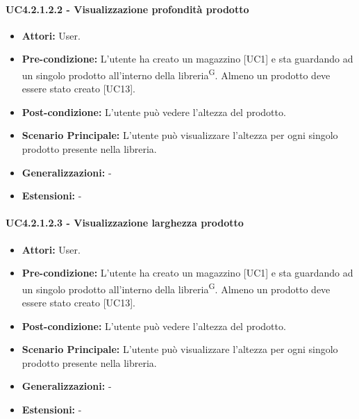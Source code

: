 \paragraph{UC4.2.1.2.2 - Visualizzazione profondità prodotto}
\begin{itemize} 
    \item \textbf{Attori:} User.
    \item \textbf{Pre-condizione:} L'utente ha creato un magazzino [UC1] e sta guardando ad un singolo prodotto all'interno della libreria\textsuperscript{G}. Almeno un prodotto deve essere stato creato [UC13].
    \item \textbf{Post-condizione:}  L'utente può vedere l'altezza del prodotto.
    \item \textbf{Scenario Principale:} L'utente può visualizzare l'altezza per ogni singolo prodotto presente nella libreria. 
    \item \textbf{Generalizzazioni:} -
    \item \textbf{Estensioni:} -
\end{itemize}


\paragraph{UC4.2.1.2.3 - Visualizzazione larghezza prodotto}
\begin{itemize} 
    \item \textbf{Attori:} User.
    \item \textbf{Pre-condizione:} L'utente ha creato un magazzino [UC1] e sta guardando ad un singolo prodotto all'interno della libreria\textsuperscript{G}. Almeno un prodotto deve essere stato creato [UC13].
    \item \textbf{Post-condizione:}  L'utente può vedere l'altezza del prodotto.
    \item \textbf{Scenario Principale:} L'utente può visualizzare l'altezza per ogni singolo prodotto presente nella libreria. 
    \item \textbf{Generalizzazioni:} -
    \item \textbf{Estensioni:} -
\end{itemize}


